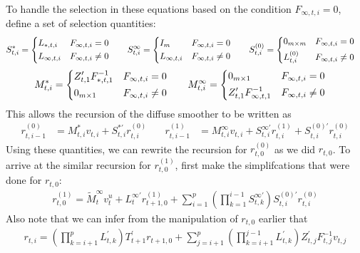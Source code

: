 \documentclass[12pt]{article}
\begin{document}
	To handle the selection in these equations based on the condition $F_{\infty,t,i} = 0$, define a set of selection quantities: 
	\begin{align*}
	S_{t,i}^* &= \begin{dcases}
		L_{*,t,i} & F_{\infty,t,i} = 0 \\
		L_{\infty,t,i} & F_{\infty,t,i} \neq 0
	\end{dcases} &\quad
	S_{t,i}^\infty &= \begin{dcases}
		I_m & F_{\infty,t,i} = 0 \\
		L_{\infty,t,i} & F_{\infty,t,i} \neq 0
	\end{dcases} &\quad
	S_{t,i}^{(0)} &= \begin{dcases}
		0_{m \times m} & F_{\infty,t,i} = 0 \\
		L_{t,i}^{(0)} & F_{\infty,t,i} \neq 0
	\end{dcases} 
	\end{align*}
	\begin{align*}
	M_{t,i}^* &= \begin{dcases}
		Z_{t,1}^\prime F_{*,t,1}^{-1} & F_{\infty,t,i} = 0 \\
		0_{m \times 1} & F_{\infty,t,i} \neq 0 
	\end{dcases} &\quad
	M_{t,i}^\infty &= \begin{dcases}
		0_{m \times 1} & F_{\infty,t,i} = 0 \\
		Z_{t,1}^\prime F_{\infty,t,1}^{-1} & F_{\infty,t,i} \neq 0
	\end{dcases} 
	\end{align*}
	This allows the recursion of the diffuse smoother to be written as 
	\begin{align*}
	r_{t,i-1}^{(0)} &= M_{t,i}^* v_{t,i} + S_{t,i}^{*\prime} r_{t,i}^{(0)} &\quad
	r_{t,i-1}^{(1)} &= M_{t,i}^\infty v_{t,i} +  S_{t,i}^{\infty\prime} r_{t,i}^{(1)} + S_{t,i}^{(0)\prime} r_{t,i}^{(0)}
	\end{align*}
	Using these quantities, we can rewrite the recursion for $r_{t,0}^{(0)}$ as we did $r_{t,0}$. To arrive at the similar recursion for $r_{t,0}^{(1)}$, first make the simplifcations that were done for $r_{t,0}$:
	\begin{align*}
	r_{t,0}^{(1)} = \tilde{M}_t^\infty v_t^u + L_t^{\infty\prime} r_{t+1,0}^{(1)} + \sum_{i=1}^p \left(\prod_{k=1}^{i-1} S_{t,k}^{\infty\prime} \right) S_{t,i}^{(0)\prime} r_{t,i}^{(0)}
	\end{align*}
	Also note that we can infer from the manipulation of $r_{t,0}$ earlier that 
	\begin{align*}
	r_{t,i} = \left(\prod_{k=i+1}^p L_{t,k}^\prime \right) T_{t+1}^\prime r_{t+1,0} + \sum_{j=i+1}^p \left(\prod_{k=i+1}^{j-1} L_{t,k}^\prime \right) Z_{t,j}^\prime F_{t,j}^{-1} v_{t,j}
	\end{align*}
\end{document}
